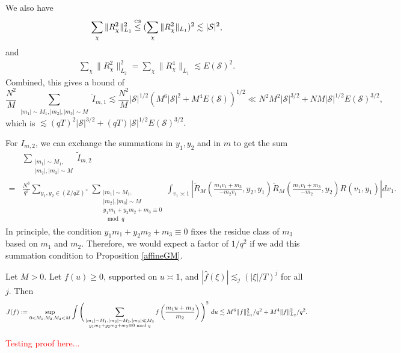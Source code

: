 We also have \begin{align*}
    \sum_{\chi} \|R_\chi^2\|_{L_1}^2\stackon{CS}{\leq}(\sum_{\chi} \|R_\chi^2\|_{L_1})^2 \lesssim |\mathcal{S}|^2,
\end{align*}
and\begin{align*}
    \sum_{\chi} \|R_\chi^2\|_{L_2}^2=\sum_{\chi} \|R_\chi^4\|_{L_1} \lesssim E(\mathcal{S})^2.
\end{align*}
Combined, this gives a bound of \[
    \frac{N^2}{M}\sum_{\substack {|m_1|\sim M_1,|m_2|,|m_3|\sim M}}\tilde{I}_{m,1}\lesssim \frac{N^2}{M} |\mathcal{S}|^{1/2} (M^6|\mathcal{S}|^{2}+M^4E(\mathcal{S}))^{1/2}\ll N^2 M^2|\mathcal{S}|^{3/2} + NM |\mathcal{S}|^{1/2}E(\mathcal{S})^{3/2},
\]
which is $\lesssim (qT)^{2}|\mathcal{S}|^{3/2}+(qT)|\mathcal{S}|^{1/2}E(\mathcal{S})^{3/2}.$


For $I_{m,2}$, we can exchange the summations in $y_1,y_2$ and in $m$ to get the sum \begin{align*}
    &\sum_{\substack {|m_1|\sim M_1,\\|m_2|,|m_3|\sim M}}\tilde{I}_{m,2}\\=&\frac{N^3}{q^2} \sum_{y_1,y_2 \in(\mathbb{Z}/q\mathbb{Z})^\times} \sum_{\substack {|m_1|\sim M_1,\\|m_2|,|m_3|\sim M\\ y_1m_1+y_2m_2+m_3\equiv 0\\ \mod q}}\int_{v_1\asymp 1} \left| \tilde{R}_M\left(\frac{m_1v_1+m_3}{-m_2v_1},y_2,y_1\right)
    \tilde{R}_M(\frac{m_1v_1+m_3}{-m_2},y_2)R\left(v_1,y_1\right)\right| dv_1.
\end{align*}
In principle, the condition $y_1m_1+y_2m_2+m_3\equiv 0$ fixes the residue class of $m_3$ based on $m_1$ and $m_2$. Therefore, we would expect a factor of $1/q^2$ if we add this summation condition to Proposition \ref{affineGM}. 
\begin{lemma}\label{affinetrans}
    Let $M>0$. Let $f(u)\geq 0$, supported on $u\asymp 1$, and $|\hat{f}(\xi)|\lesssim_j (|\xi|/T)^j$ for all $j$. Then \[
        J(f)\mathrel{\mathop:}= \sup_{0<M_1,M_2,M_3<M} \int\Bigg( \sum_{\substack{|m_1|\sim M_1,|m_2|\sim M_2 , |m_3|\ll M_3\\ y_1m_1+y_2m_2+m_3\equiv 0 \textrm{ mod } q}} f\left(\frac{m_1 u+m_3}{m_2}\right)\Bigg)^2 \ du \lesssim M^6 \|f\|_{L_1}^2/q^2+M^4\|f\|_{L_2}^2/q^2.
    \] 
\end{lemma}
\textcolor{red}{Testing proof here...}

